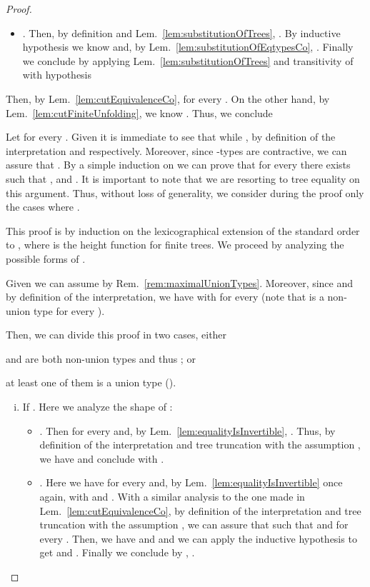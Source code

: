 \begin{proof}
\begin{itemize}
\begin{itemize}
    \item . Then, by definition and Lem.~\ref{lem:substitutionOfTrees},
    . By inductive
    hypothesis we know  and, by
    Lem.~\ref{lem:substitutionOfEqtypesCo}, . Finally we conclude by applying
    Lem.~\ref{lem:substitutionOfTrees} and transitivity of  with
    hypothesis 
    
  \end{itemize}
  
  Then, by Lem.~\ref{lem:cutEquivalenceCo},  for every . On the other
  hand, by Lem.~\ref{lem:cutFiniteUnfolding}, we know
  . Thus, we
  conclude 
\end{itemize}


 Let  for
every . Given  it is immediate to see that
 while , by definition of the interpretation and
 respectively. Moreover, since -types are contractive, we
can assure that . By a simple induction on  we can
prove that for every  there exists  such that
,  and . It
is important to note that we are resorting to tree equality on this argument.
Thus, without loss of generality, we consider during the proof only the cases
where .

This proof is by induction on the lexicographical extension of the standard
order to , where  is the height function for finite trees. We proceed
by analyzing the possible forms of .

Given  we can assume  by Rem.~\ref{rem:maximalUnionTypes}. Moreover, since
 and by definition of the interpretation, we have
 with  for every  (note that  is a non-union type for every ).

Then, we can divide this proof in two cases, either
\begin{inparaenum}[(i)]
  \item  and  are both non-union types and thus ; or
  \item at least one of them is a union type (\ie ).
\end{inparaenum}

\begin{enumerate}[(i)]
  \item If . Here we analyze the shape of :
  \begin{itemize}
    \item . Then  for every  and, by
    Lem.~\ref{lem:equalityIsInvertible}, . Thus, by definition of the interpretation and tree truncation with
    the assumption , we have  and conclude with
    .
    
    \item . Here we have  for every  and, by Lem.~\ref{lem:equalityIsInvertible} once again,
     with
     and . With a similar analysis to the one made in
    Lem.~\ref{lem:cutEquivalenceCo}, by definition of the interpretation and
    tree truncation with the assumption , we can
    assure that  such that  and  for every
    . Then, we have  and  and we can apply the inductive hypothesis to get
     and . Finally we conclude by
    , .


\end{itemize}
\end{enumerate}
\end{proof}
